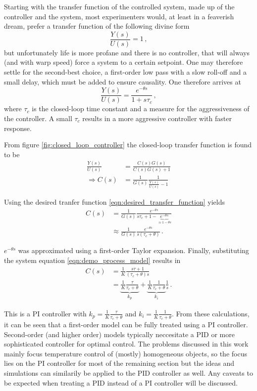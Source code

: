 Starting with the transfer function of the controlled system, made up of the controller and the system, most experimenters would, at least in a feaverish dream, prefer a transfer function of the following divine form
\begin{equation*}
    \frac{Y(s)}{U(s)} = 1 \,,
\end{equation*}
but unfortunately life is more profane and there is no controller, that will always (and with warp speed) force a system to a certain setpoint. One may therefore settle for the second-best choice, a first-order low pass with a slow roll-off and a small delay, which must be added to ensure causality. One therefore arrives at
\begin{equation}
    \frac{Y(s)}{U(s)} = \frac{e^{-\theta s}}{1 + s \tau_c}\,, \label{eqn:desired_transfer_function}
\end{equation}
where $\tau_c$ is the closed-loop time constant and a measure for the aggressiveness of the controller. A small $\tau_c$ results in a more aggressive controller with faster response.

From figure \ref{fig:closed_loop_controller} the closed-loop transfer function is found to be
\begin{align*}
    \frac{Y(s)}{U(s)} &= \frac{C(s) G(s)}{C(s) G(s) + 1} \\
    \Rightarrow C(s) &= \frac{1}{G(s)} \frac{1}{\frac{Y(s)}{U(s)} -1}
\end{align*}

Using the desired tranfer function \ref{eqn:desired_transfer_function} yields
\begin{align}
    C(s) &= \frac{1}{G(s)} \frac{e^{-\theta s}}{s \tau_c +1 - \underbrace{e^{-\theta s}}_{\approx 1 - \theta s}}\\
    &\approx \frac{1}{G(s)} \frac{e^{-\theta s}}{s (\tau_c + \theta)} \,.
\end{align}

$e^{-\theta s}$ was approximated using a first-order Taylor expansion. Finally, substituting the system equation \ref{eqn:demo_process_model} results in
\begin{align}
    C(s) &= \frac{1}{K} \frac{s \tau + 1}{(\tau_c + \theta) s} \nonumber\\
    &= \underbrace{\frac{1}{K} \frac{\tau}{\tau_c + \theta}}_{k_p} + \underbrace{\frac{1}{K} \frac{1}{\tau_c + \theta}}_{k_i} \frac{1}{s}\,.
\end{align}

This is a PI controller with $k_p = \frac{1}{K} \frac{\tau}{\tau_c + \theta}$ and $k_i = \frac{1}{K} \frac{1}{\tau_c + \theta}$. From these calculations, it can be seen that a first-order model can be fully treated using a PI controller. Second-order (and higher order) models typically neccesitate a PID or more sophisticated controller for optimal control. The problems discussed in this work mainly focus temperature control of (mostly) homogeneous objects, so the focus lies on the PI controller for most of the remaining section but the ideas and simulations can similarily be applied to the PID controller as well. Any caveats to be expected when treating a PID instead of a PI controller will be discussed.

